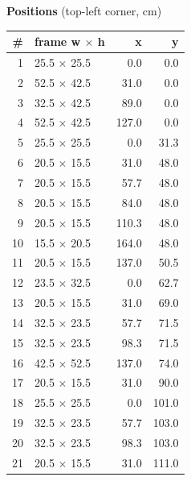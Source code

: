 \documentclass[a4paper,landscape,10pt]{article}
\begin{document}
\begin{minipage}[t]{0.25\textwidth}
\vspace{8pt}
{\bfseries Positions} (top-left corner, cm)\\[2pt]
\tiny
\begin{tabular}{@{}r l r r@{}}
\toprule
\# & frame w $\times$ h & x & y \\
\midrule
1 & 25.5 $\times$ 25.5 & 0.0 & 0.0 \\
2 & 52.5 $\times$ 42.5 & 31.0 & 0.0 \\
3 & 32.5 $\times$ 42.5 & 89.0 & 0.0 \\
4 & 52.5 $\times$ 42.5 & 127.0 & 0.0 \\
5 & 25.5 $\times$ 25.5 & 0.0 & 31.3 \\
6 & 20.5 $\times$ 15.5 & 31.0 & 48.0 \\
7 & 20.5 $\times$ 15.5 & 57.7 & 48.0 \\
8 & 20.5 $\times$ 15.5 & 84.0 & 48.0 \\
9 & 20.5 $\times$ 15.5 & 110.3 & 48.0 \\
10 & 15.5 $\times$ 20.5 & 164.0 & 48.0 \\
11 & 20.5 $\times$ 15.5 & 137.0 & 50.5 \\
12 & 23.5 $\times$ 32.5 & 0.0 & 62.7 \\
13 & 20.5 $\times$ 15.5 & 31.0 & 69.0 \\
14 & 32.5 $\times$ 23.5 & 57.7 & 71.5 \\
15 & 32.5 $\times$ 23.5 & 98.3 & 71.5 \\
16 & 42.5 $\times$ 52.5 & 137.0 & 74.0 \\
17 & 20.5 $\times$ 15.5 & 31.0 & 90.0 \\
18 & 25.5 $\times$ 25.5 & 0.0 & 101.0 \\
19 & 32.5 $\times$ 23.5 & 57.7 & 103.0 \\
20 & 32.5 $\times$ 23.5 & 98.3 & 103.0 \\
21 & 20.5 $\times$ 15.5 & 31.0 & 111.0 \\
\bottomrule
\end{tabular}
\end{minipage}
\clearpage
\end{document}

